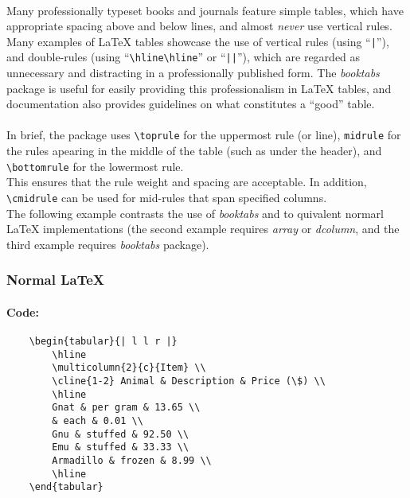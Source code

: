 \paragraph{}
Many professionally typeset books and journals feature simple tables,
which have appropriate spacing above and below lines, and almost \emph{never}
use vertical rules. \\
Many examples of \LaTeX{} tables showcase the use of vertical rules (using ``\verb+|+''),
and double-rules (using ``\verb|\hline\hline|'' or ``\verb+||+''), which are regarded as
unnecessary and distracting in a professionally published form. The \emph{booktabs}
package is useful for easily providing this professionalism in \LaTeX{} tables, and
documentation also provides guidelines on what constitutes a ``good'' table.
\paragraph{}
In brief, the package uses \verb|\toprule| for the uppermost rule (or line),
\verb|midrule| for the rules apearing in the middle of the table (such as under the header),
and \verb|\bottomrule| for the lowermost rule. \\
This ensures that the rule weight and spacing are acceptable. In addition, \verb|\cmidrule|
can be used for mid-rules that span specified columns.\\
The following example contrasts the use of \emph{booktabs} and to quivalent normarl \LaTeX{}
implementations (the second example requires \emph{array} or \emph{dcolumn},
and the third example requires \emph{booktabs} package).
\subsubsection{Normal \LaTeX{}}
%
\paragraph{Code:}
\begin{verbatim}
	\begin{tabular}{| l l r |}
		\hline
		\multicolumn{2}{c}{Item} \\
		\cline{1-2} Animal & Description & Price (\$) \\
		\hline
		Gnat & per gram & 13.65 \\
		& each & 0.01 \\
		Gnu & stuffed & 92.50 \\
		Emu & stuffed & 33.33 \\
		Armadillo & frozen & 8.99 \\
		\hline
	\end{tabular}
\end{verbatim}

